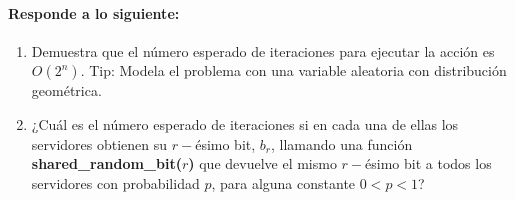 \documentclass[12pt]{article}
\begin{document}
\paragraph{Responde a lo siguiente:}
\begin{enumerate}
	\item Demuestra que el número esperado de iteraciones para ejecutar la acción es $O(2^n)$. Tip: Modela el problema con una variable aleatoria con distribución geométrica.
	\item ¿Cuál es el número esperado de iteraciones si en cada una de ellas los servidores obtienen su $r-$ésimo bit, $b_r$, llamando una función \textbf{shared\_random\_bit($r$)} que devuelve el mismo $r-$ésimo bit a todos los servidores con probabilidad $p$, para alguna constante $0 < p < 1$?
\end{enumerate}
\end{document}
